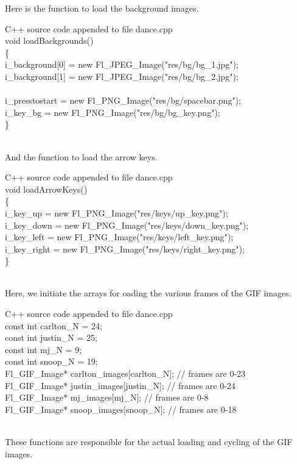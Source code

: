 \documentclass {article}
\begin{document}
\clearpage
Here is the function to load the background images.
\begin{GFT}{C++ source code appended to file dance.cpp}
\+\\
\+void loadBackgrounds()\\
\+\{\\
\+	i\_background[0] = new Fl\_JPEG\_Image("res/bg/bg\_1.jpg");\\
\+	i\_background[1] = new Fl\_JPEG\_Image("res/bg/bg\_2.jpg");\\
\+	\\
\+	i\_presstostart = new Fl\_PNG\_Image("res/bg/spacebar.png");\\
\+	i\_key\_bg = new Fl\_PNG\_Image("res/bg/bg\_key.png");\\
\+\}\\
\+\\
\end{GFT}
\clearpage
And the function to load the arrow keys.
\begin{GFT}{C++ source code appended to file dance.cpp}
\+\\
\+void loadArrowKeys()\\
\+\{\\
\+	i\_key\_up = new Fl\_PNG\_Image("res/keys/up\_key.png");\\
\+	i\_key\_down = new Fl\_PNG\_Image("res/keys/down\_key.png");\\
\+	i\_key\_left = new Fl\_PNG\_Image("res/keys/left\_key.png");\\
\+	i\_key\_right = new Fl\_PNG\_Image("res/keys/right\_key.png");\\
\+\}\\
\+\\
\end{GFT}
\clearpage
Here, we initiate the arrays for oading the various frames of the GIF images.

\begin{GFT}{C++ source code appended to file dance.cpp}
\+\\
\+const int carlton\_N = 24;\\
\+const int justin\_N = 25;\\
\+const int mj\_N = 9;\\
\+const int snoop\_N = 19;\\
\+Fl\_GIF\_Image* carlton\_images[carlton\_N]; // frames are 0-23\\
\+Fl\_GIF\_Image* justin\_images[justin\_N]; // frames are 0-24\\
\+Fl\_GIF\_Image* mj\_images[mj\_N]; // frames are 0-8\\
\+Fl\_GIF\_Image* snoop\_images[snoop\_N]; // frames are 0-18\\
\+\\
\end{GFT}
\clearpage
These functions are responsible for the actual loading and cycling of the GIF images. 
\end{document}
